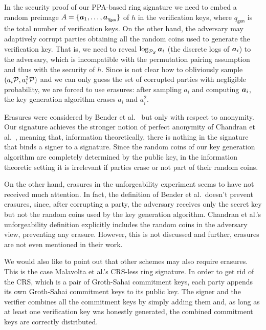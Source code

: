 
\label{sect:erasures}
In the security proof of our PPA-based ring signature we need to embed a random preimage $A=\{{\boldsymbol{a}}_1,\ldots,\allowbreak {\boldsymbol{a}}_{q_{\mathsf{gen}}}\}$ of $h$ in the verification keys, where $q_{\mathsf{gen}}$ is the total number of verification keys. On the other hand, the adversary may adaptively corrupt parties obtaining all the random coins used to generate the verification key. That is, we need to reveal $\log_{\mathcal{P}_S} {\boldsymbol{a}}_i$ (the discrete logs of ${\boldsymbol{a}}_i$) to the adversary, which is incompatible with the permutation pairing assumption and thus with the security of $h$. Since is not clear how to obliviously sample $(a_i\mathcal{P},a^2_i\mathcal{P})$ and we can only guess the set of corrupted parties with negligible probability, we are forced to use erasures: after sampling $a_i$ and computing ${\boldsymbol{a}}_i$, the key generation algorithm erases $a_i$ and $a_i^2$.

Erasures were considered by Bender et al.~\cite{TCC:BenKatMor06} but only with respect to anony\-mity. Our signature achieves the stronger notion of perfect anonymity of Chandran et al.~\cite{ICALP:ChaGroSah07}, meaning that, information theoretically, there is nothing in the signature that binds a signer to a signature. Since the random coins of our key generation algorithm are completely determined by the public key, in the information theoretic setting it is irrelevant if parties erase or not part of their random coins.

On the other hand, erasures in the unforgeability experiment seems to have not received much attention. In fact, the definition of Bender et al.~doesn't prevent erasures, since, after corrupting a party, the adversary receives only the secret key but not the random coins used by the key generation algorithm.  Chandran et al.'s unforgeability definition explicitly includes the random coins in the adversary view, preventing any erasure. However, this is not discussed and further, erasures are not even mentioned in their work.

We would also like to point out that other schemes may also require erasures. This is the case Malavolta et al.'s CRS-less ring signature. In order to get rid of the CRS, which is a pair of Groth-Sahai commitment keys, each party appends its own Groth-Sahai commitment keys to its public key. The signer and the verifier combines all the commitment keys by simply adding them and, as long as at least one verification key was honestly generated, the combined commitment keys are correctly distributed.

